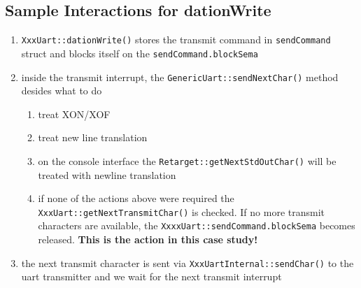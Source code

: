 \subsection{Sample Interactions for dationWrite}
\begin{enumerate}
\item \texttt{XxxUart::dationWrite()} stores the transmit command in \texttt{sendCommand} struct and 
     blocks itself on the \texttt{sendCommand.blockSema}
\item inside the transmit interrupt, the \texttt{GenericUart::sendNextChar()} method
    desides what to do 
    \begin{enumerate}
    \item treat XON/XOF
    \item treat new line translation
    \item on the console interface the \texttt{Retarget::getNextStdOutChar()} 
        will be treated with newline translation\newline
    \item if none of the actions above were required the \texttt{XxxUart::getNextTransmitChar()}
        is checked. If no more transmit characters are available, the \texttt{XxxxUart::sendCommand.blockSema}
        becomes released.
        \textbf{This is the action in this case study!}
    \end{enumerate}
\item the next transmit character is sent via \texttt{XxxUartInternal::sendChar()} to the 
    uart transmitter and we wait for the next transmit interrupt
\end{enumerate}

